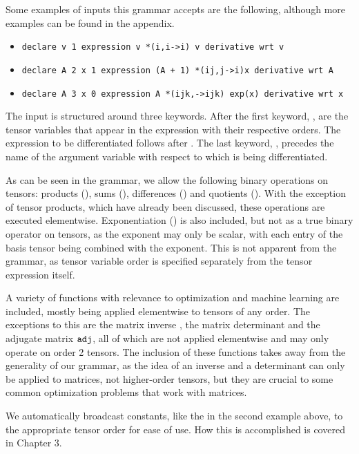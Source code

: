 \documentclass[12pt, a4paper]{report} %
\begin{document}
Some examples of inputs this grammar accepts are the following, although more examples can be found in the appendix.

\begin{itemize}
    \item \texttt{declare v 1 expression v *(i,i->i) v derivative wrt v}
    \item \texttt{declare A 2 x 1 expression (A + 1) *(ij,j->i)x derivative wrt A}
    \item \texttt{declare A 3 x 0 expression A *(ijk,->ijk) exp(x) derivative wrt x}
\end{itemize}

The input is structured around three keywords.
After the first keyword, , are the tensor variables that appear in the expression with their respective orders.
The expression to be differentiated follows after .
The last keyword, , precedes the name of the argument variable with respect to which is being differentiated.

As can be seen in the grammar, we allow the following binary operations on tensors: products (\codeword{*(,->)}), sums (\codeword{+}), differences (\codeword{-}) and quotients (\codeword{/}).
With the exception of tensor products, which have already been discussed, these operations are executed elementwise.
Exponentiation (\codeword{^}) is also included, but not as a true binary operator on tensors, as the exponent may only be scalar, with each entry of the basis tensor being combined with the exponent.
This is not apparent from the grammar, as tensor variable order is specified separately from the tensor expression itself.

A variety of functions with relevance to optimization and machine learning are included, mostly being applied elementwise to tensors of any order.
The exceptions to this are the matrix inverse , the matrix determinant  and the adjugate matrix $\codeword{adj}$, all of which are not applied elementwise and may only operate on order 2 tensors.
The inclusion of these functions takes away from the generality of our grammar, as the idea of an inverse and a determinant can only be applied to matrices, not higher-order tensors, but they are crucial to some common optimization problems that work with matrices.

We automatically broadcast constants, like the  in the second example above, to the appropriate tensor order for ease of use.
How this is accomplished is covered in Chapter 3.
\end{document}
